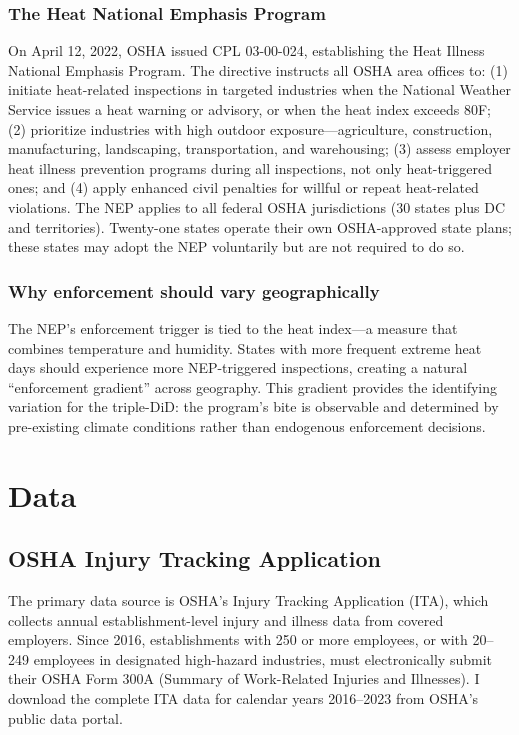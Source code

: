 \documentclass[12pt]{article}
\begin{document}
\subsubsection*{The Heat National Emphasis Program} On April 12, 2022, OSHA issued CPL 03-00-024, establishing the Heat Illness National Emphasis Program. The directive instructs all OSHA area offices to: (1) initiate heat-related inspections in targeted industries when the National Weather Service issues a heat warning or advisory, or when the heat index exceeds 80\textdegree F; (2) prioritize industries with high outdoor exposure---agriculture, construction, manufacturing, landscaping, transportation, and warehousing; (3) assess employer heat illness prevention programs during all inspections, not only heat-triggered ones; and (4) apply enhanced civil penalties for willful or repeat heat-related violations. The NEP applies to all federal OSHA jurisdictions (30 states plus DC and territories). Twenty-one states operate their own OSHA-approved state plans; these states may adopt the NEP voluntarily but are not required to do so.

\subsubsection*{Why enforcement should vary geographically} The NEP's enforcement trigger is tied to the heat index---a measure that combines temperature and humidity. States with more frequent extreme heat days should experience more NEP-triggered inspections, creating a natural ``enforcement gradient'' across geography. This gradient provides the identifying variation for the triple-DiD: the program's bite is observable and determined by pre-existing climate conditions rather than endogenous enforcement decisions.


\section{Data}

\subsection{OSHA Injury Tracking Application}

The primary data source is OSHA's Injury Tracking Application (ITA), which collects annual establishment-level injury and illness data from covered employers. Since 2016, establishments with 250 or more employees, or with 20--249 employees in designated high-hazard industries, must electronically submit their OSHA Form 300A (Summary of Work-Related Injuries and Illnesses). I download the complete ITA data for calendar years 2016--2023 from OSHA's public data portal.
\end{document}

